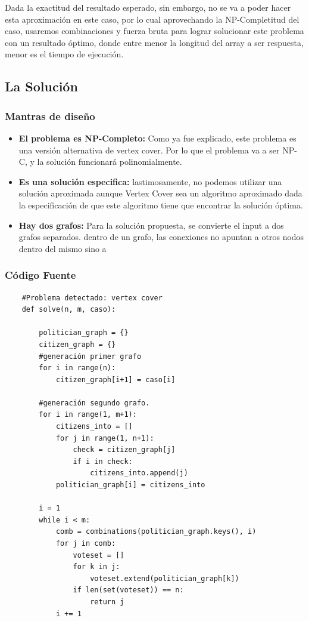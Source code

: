 \documentclass[a4paper]{article}
\begin{document}
Dada la exactitud del resultado esperado, sin embargo, no se va a poder hacer esta
aproximación en este caso, por lo cual aprovechando la NP-Completitud del caso, usaremos
combinaciones y fuerza bruta para lograr solucionar este problema con un resultado óptimo,
donde entre menor la longitud del array a ser respuesta, menor es el tiempo de ejecución.


\subsection{La Solución}
\subsubsection{Mantras de diseño}
\begin{itemize}
    \item \textbf{El problema es NP-Completo: }
    Como ya fue explicado, este problema es una versión alternativa de vertex cover. Por lo que el 
    problema va a ser NP-C, y la solución funcionará polinomialmente.
    \item \textbf{Es una solución especifica: } lastimosamente, no podemos utilizar una solución aproximada aunque
    Vertex Cover sea un algoritmo aproximado dada la especificación de que este algoritmo tiene que
    encontrar la solución óptima. 
    \item \textbf{Hay dos grafos: } Para la solución propuesta, se convierte el input a dos grafos 
    separados. dentro de un grafo, las conexiones no apuntan a otros nodos dentro del mismo sino a 
\end{itemize}

\subsubsection{Código Fuente}
\begin{verbatim}
    #Problema detectado: vertex cover
    def solve(n, m, caso):

        politician_graph = {}
        citizen_graph = {}
        #generación primer grafo
        for i in range(n):
            citizen_graph[i+1] = caso[i]
        
        #generación segundo grafo.
        for i in range(1, m+1):
            citizens_into = []
            for j in range(1, n+1):
                check = citizen_graph[j]
                if i in check:
                    citizens_into.append(j)
            politician_graph[i] = citizens_into

        i = 1
        while i < m:
            comb = combinations(politician_graph.keys(), i)
            for j in comb:
                voteset = []
                for k in j:
                    voteset.extend(politician_graph[k])
                if len(set(voteset)) == n:
                    return j
            i += 1
\end{verbatim}
\end{document}
